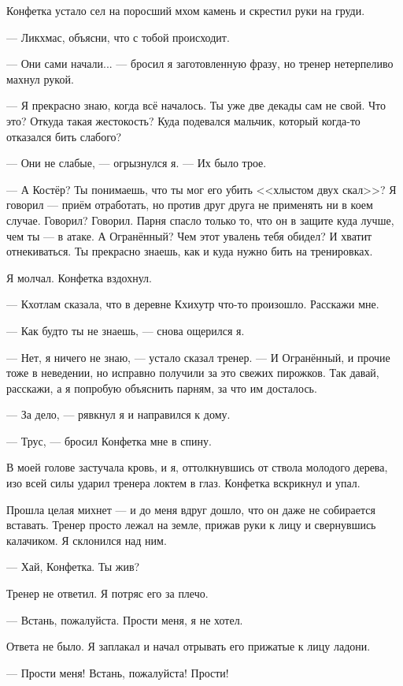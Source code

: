 Конфетка устало сел на поросший мхом камень и скрестил руки на груди.

--- Ликхмас, объясни, что с тобой происходит.

--- Они сами начали... --- бросил я заготовленную фразу, но тренер нетерпеливо махнул рукой.

--- Я прекрасно знаю, когда всё началось.
Ты уже две декады сам не свой.
Что это?
Откуда такая жестокость?
Куда подевался мальчик, который когда-то отказался бить слабого?

--- Они не слабые, --- огрызнулся я.
--- Их было трое.

--- А Костёр?
Ты понимаешь, что ты мог его убить <<хлыстом двух скал>>?
Я говорил --- приём отработать, но против друг друга не применять ни в коем случае.
Говорил?
Говорил.
Парня спасло только то, что он в защите куда лучше, чем ты --- в атаке.
А Огранённый?
Чем этот увалень тебя обидел?
И хватит отнекиваться.
Ты прекрасно знаешь, как и куда нужно бить на тренировках.

Я молчал.
Конфетка вздохнул.

--- Кхотлам сказала, что в деревне Кхихутр что-то произошло.
Расскажи мне.

--- Как будто ты не знаешь, --- снова ощерился я.

--- Нет, я ничего не знаю, --- устало сказал тренер.
--- И Огранённый, и прочие тоже в неведении, но исправно получили за это свежих пирожков.
Так давай, расскажи, а я попробую объяснить парням, за что им досталось.

--- За дело, --- рявкнул я и направился к дому.

--- Трус, --- бросил Конфетка мне в спину.

В моей голове застучала кровь, и я, оттолкнувшись от ствола молодого дерева, изо всей силы ударил тренера локтем в глаз.
Конфетка вскрикнул и упал.

Прошла целая михнет --- и до меня вдруг дошло, что он даже не собирается вставать.
Тренер просто лежал на земле, прижав руки к лицу и свернувшись калачиком.
Я склонился над ним.

--- Хай, Конфетка.
Ты жив?

Тренер не ответил.
Я потряс его за плечо.

--- Встань, пожалуйста.
Прости меня, я не хотел.

Ответа не было.
Я заплакал и начал отрывать его прижатые к лицу ладони.

--- Прости меня!
Встань, пожалуйста!
Прости!

